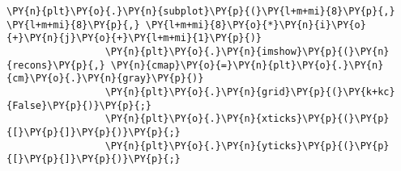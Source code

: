 \begin{Verbatim}[commandchars=\\\{\}]
                 \PY{n}{plt}\PY{o}{.}\PY{n}{subplot}\PY{p}{(}\PY{l+m+mi}{8}\PY{p}{,} \PY{l+m+mi}{8}\PY{p}{,} \PY{l+m+mi}{8}\PY{o}{*}\PY{n}{i}\PY{o}{+}\PY{n}{j}\PY{o}{+}\PY{l+m+mi}{1}\PY{p}{)}
                 \PY{n}{plt}\PY{o}{.}\PY{n}{imshow}\PY{p}{(}\PY{n}{recons}\PY{p}{,} \PY{n}{cmap}\PY{o}{=}\PY{n}{plt}\PY{o}{.}\PY{n}{cm}\PY{o}{.}\PY{n}{gray}\PY{p}{)}
                 \PY{n}{plt}\PY{o}{.}\PY{n}{grid}\PY{p}{(}\PY{k+kc}{False}\PY{p}{)}\PY{p}{;}
                 \PY{n}{plt}\PY{o}{.}\PY{n}{xticks}\PY{p}{(}\PY{p}{[}\PY{p}{]}\PY{p}{)}\PY{p}{;}
                 \PY{n}{plt}\PY{o}{.}\PY{n}{yticks}\PY{p}{(}\PY{p}{[}\PY{p}{]}\PY{p}{)}\PY{p}{;}
\end{Verbatim}


    \begin{center}
    \end{center}
    { \hspace*{\fill} \\}
    
